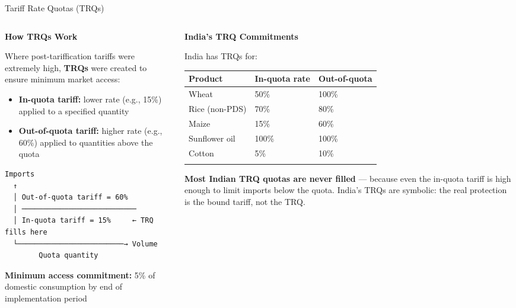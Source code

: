 \documentclass[
  ignorenonframetext,
  aspectratio=169,
]{beamer}
\makeatletter
\providecommand{\tightlist}{%
  \setlength{\itemsep}{0pt}\setlength{\parskip}{0pt}}
\let\quarto@originallabel\label
\DeclareRobustCommand*{\label}[1]{\quarto@originallabel{#1}}
\makeatother
\begin{document}
\begin{frame}[fragile]{Tariff Rate Quotas (TRQs)}
\label{tariff-rate-quotas-trqs}
\begin{columns}[T]
\begin{column}{0.55\linewidth}
\textbf{How TRQs Work}

Where post-tariffication tariffs were extremely high, \textbf{TRQs} were
created to ensure minimum market access:

\begin{itemize}
\tightlist
\item
  \textbf{In-quota tariff:} lower rate (e.g., 15\%) applied to a
  specified quantity
\item
  \textbf{Out-of-quota tariff:} higher rate (e.g., 60\%) applied to
  quantities above the quota
\end{itemize}

\begin{verbatim}
Imports
  ↑
  │ Out-of-quota tariff = 60%
  │ ───────────────────────────
  │ In-quota tariff = 15%     ← TRQ fills here
  └─────────────────────────→ Volume
        Quota quantity
\end{verbatim}

\textbf{Minimum access commitment:} 5\% of domestic consumption by end
of implementation period
\end{column}

\begin{column}{0.45\linewidth}
\textbf{India's TRQ Commitments}

India has TRQs for:

\begin{longtable}[]{@{}lll@{}}
\toprule\noalign{}
Product & In-quota rate & Out-of-quota \\
\midrule\noalign{}
\endhead
Wheat & 50\% & 100\% \\
Rice (non-PDS) & 70\% & 80\% \\
Maize & 15\% & 60\% \\
Sunflower oil & 100\% & 100\% \\
Cotton & 5\% & 10\% \\
\bottomrule\noalign{}
\end{longtable}

\textbf{Most Indian TRQ quotas are never filled} --- because even the
in-quota tariff is high enough to limit imports below the quota. India's
TRQs are symbolic: the real protection is the bound tariff, not the TRQ.
\end{column}
\end{columns}
\end{frame}
\end{document}
